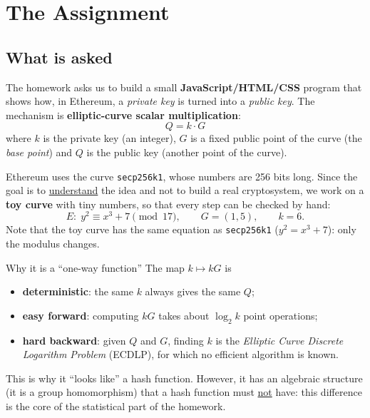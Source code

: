 \chapter{The Assignment}


\section{What is asked}

The homework asks us to build a small \textbf{JavaScript/HTML/CSS} program that shows how, in Ethereum, a \textit{private key} is turned into a \textit{public key}. The mechanism is \textbf{elliptic-curve scalar multiplication}:
\[
  Q = k \cdot G
\]
where $k$ is the private key (an integer), $G$ is a fixed public point of the curve (the \textit{base point}) and $Q$ is the public key (another point of the curve).

Ethereum uses the curve \texttt{secp256k1}, whose numbers are 256 bits long. Since the goal is to \underline{understand} the idea and not to build a real cryptosystem, we work on a \textbf{toy curve} with tiny numbers, so that every step can be checked by hand:
\[
  E:\; y^2 \equiv x^3 + 7 \pmod{17}, \qquad G = (1,5), \qquad k = 6.
\]
Note that the toy curve has the same equation as \texttt{secp256k1} ($y^2 = x^3 + 7$): only the modulus changes.

\begin{framedobs}{Why it is a ``one-way function''}
  The map $k \mapsto kG$ is
  \begin{itemize}
    \item \textbf{deterministic}: the same $k$ always gives the same $Q$;
    \item \textbf{easy forward}: computing $kG$ takes about $\log_2 k$ point operations;
    \item \textbf{hard backward}: given $Q$ and $G$, finding $k$ is the \textit{Elliptic Curve Discrete Logarithm Problem} (ECDLP), for which no efficient algorithm is known.
  \end{itemize}
  This is why it ``looks like'' a hash function. However, it has an algebraic structure (it is a group homomorphism) that a hash function must \underline{not} have: this difference is the core of the statistical part of the homework.
\end{framedobs}

